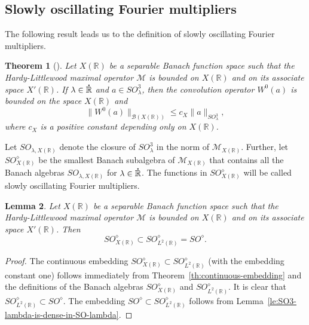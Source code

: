 \documentclass{birkjour}
\newtheorem{theorem}{Theorem}[section]
\newtheorem{lemma}[theorem]{Lemma}
\numberwithin{equation}{section}
\newcommand{\R}{\mathbb{R}}
\newcommand{\cB}{\mathcal{B}}
\newcommand{\cM}{\mathcal{M}}
\newcommand{\dR}{{\bf\dot{\R}}}
\begin{document}
\subsection{Slowly oscillating Fourier multipliers}
\label{sec:SO-multipliers}
The following result leads us to the definition of slowly oscillating
Fourier multipliers.
\begin{theorem}[{\cite[Theorem~2.5]{K15c}}]
\label{th:boundedness-convolution-SO}
Let $X(\R)$ be a separable Banach function space such that the
Hardy-Littlewood maximal operator $\cM$ is bounded on $X(\R)$ and on its
associate space $X'(\R)$. If $\lambda\in\dR$ and $a\in SO_\lambda^3$, then
the convolution operator $W^0(a)$ is bounded on the space $X(\R)$ and
\begin{equation}\label{eq:boundedness-convolution-SO}
\|W^0(a)\|_{\cB(X(\R))}
\le
c_{X}\|a\|_{SO_\lambda^3},
\end{equation}
where $c_{X}$ is a positive constant depending only on $X(\R)$.
\end{theorem}
Let $SO_{\lambda,X(\R)}$ denote the closure of $SO_\lambda^3$ in the norm of
$\cM_{X(\R)}$. Further, let $SO_{X(\R)}^\diamond$ be the smallest Banach
subalgebra of $\cM_{X(\R)}$ that contains all the Banach algebras
$SO_{\lambda,X(\R)}$ for $\lambda\in\dR$. The functions in
$SO_{X(\R)}^\diamond$ will be called slowly oscillating Fourier multipliers.
\begin{lemma}\label{le:SO-continuous-embedding}
Let $X(\R)$ be a separable Banach function space such that the
Hardy-Littlewood maximal operator $\cM$ is bounded on $X(\R)$ and on its
associate space $X'(\R)$. Then
\[
SO_{X(\R)}^\diamond\subset SO_{L^2(\R)}^\diamond=SO^\diamond.
\]
\end{lemma}
\begin{proof}
The continuous embedding
$SO_{X(\R)}^\diamond\subset SO_{L^2(\R)}^\diamond$
(with the embedding constant one) follows immediately from
Theorem~\ref{th:continuous-embedding} and the definitions
of the Banach algebras $SO_{X(\R)}^\diamond$ and $SO_{L^2(\R)}^\diamond$.
It is clear that $SO_{L^2(\R)}^\diamond \subset SO^\diamond$. The embedding
$SO^\diamond\subset SO_{L^2(\R)}^\diamond$ follows from
Lemma~\ref{le:SO3-lambda-is-dense-in-SO-lambda}.
\end{proof}
\end{document}
